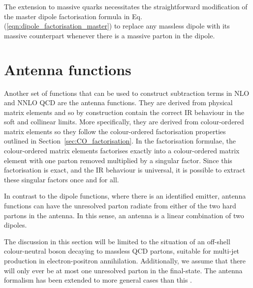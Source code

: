 \documentclass[main.tex]{subfiles}
\begin{document}
        The extension to massive quarks necessitates the straightforward
        modification of the master dipole factorisation formula
        in Eq. (\ref{eqn:dipole_factorisation_master}) to replace
        any massless dipole with its massive counterpart whenever
        there is a massive parton in the dipole.

\section{Antenna functions}\label{sec:antenna_functions}
    Another set of functions that can be used to construct
    subtraction terms in NLO \cite{Kosower:1997zr,Campbell:1998nn}
    and NNLO QCD \cite{Gehrmann-DeRidder:2004ttg,Gehrmann-DeRidder:2005btv}
    are the antenna functions. They are derived from physical
    matrix elements and so by construction contain the correct
    IR behaviour in the soft and collinear limits. More specifically,
    they are derived from colour-ordered matrix elements so they
    follow the colour-ordered factorisation properties outlined
    in Section~\ref{sec:CO_factorisation}. In the factorisation
    formulae, the colour-ordered matrix elements factorises
    exactly into a colour-ordered matrix element with one parton
    removed multiplied by a singular factor. Since this factorisation
    is exact, and the IR behaviour is universal, it is possible
    to extract these singular factors once and for all.

    In contrast to the dipole functions, where there is an identified
    emitter, antenna functions can have the unresolved parton
    radiate from either of the two hard partons in the antenna.
    In this sense, an antenna is a linear combination of two dipoles.

    The discussion in this section will be limited to the
    situation of an off-shell colour-neutral boson decaying
    to massless QCD partons, suitable for multi-jet production
    in electron-positron annihilation. Additionally, we
    assume that there will only ever be at most one unresolved
    parton in the final-state. The antenna formalism has been
    extended to more general cases than this \cite{Daleo:2006xa,Daleo:2009yj,Boughezal:2010mc,Gehrmann:2011wi,Gehrmann-DeRidder:2012too}.
\end{document}
